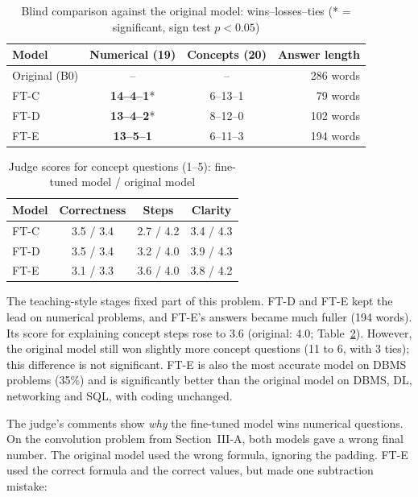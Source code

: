 \documentclass[conference]{IEEEtran}
\begin{document}
\begin{table}[t]
\centering
\caption{Blind comparison against the original model: wins--losses--ties (* = significant, sign test $p<0.05$)}
\label{tab:pair}
\begin{tabular}{@{}l c c r@{}}
\toprule
Model & Numerical (19) & Concepts (20) & Answer length \\
\midrule
Original (B0) & -- & -- & 286 words \\
FT-C & \textbf{14--4--1}* & 6--13--1 & 79 words \\
FT-D & \textbf{13--4--2}* & 8--12--0 & 102 words \\
FT-E & \textbf{13--5--1} & 6--11--3 & 194 words \\
\bottomrule
\end{tabular}
\end{table}

\begin{table}[t]
\centering
\caption{Judge scores for concept questions (1--5): fine-tuned model / original model}
\label{tab:scores}
\begin{tabular}{@{}l c c c@{}}
\toprule
Model & Correctness & Steps & Clarity \\
\midrule
FT-C & 3.5 / 3.4 & 2.7 / 4.2 & 3.4 / 4.3 \\
FT-D & 3.5 / 3.4 & 3.2 / 4.0 & 3.9 / 4.3 \\
FT-E & 3.1 / 3.3 & 3.6 / 4.0 & 3.8 / 4.2 \\
\bottomrule
\end{tabular}
\end{table}

The teaching-style stages fixed part of this problem. FT-D and FT-E kept the lead on numerical problems, and FT-E's answers became much fuller (194 words). Its score for explaining concept steps rose to 3.6 (original: 4.0; Table~\ref{tab:scores}). However, the original model still won slightly more concept questions (11 to 6, with 3 ties); this difference is not significant. FT-E is also the most accurate model on DBMS problems (35\%) and is significantly better than the original model on DBMS, DL, networking and SQL, with coding unchanged.

The judge's comments show \emph{why} the fine-tuned model wins numerical questions. On the convolution problem from Section~III-A, both models gave a wrong final number. The original model used the wrong formula, ignoring the padding. FT-E used the correct formula and the correct values, but made one subtraction mistake:
\end{document}

